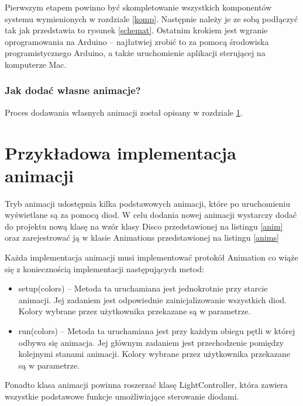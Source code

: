 \documentclass[12pt]{report}
\begin{document}
Pierwszym etapem powinno być skompletowanie wszystkich komponentów systemu wymienionych w rozdziale \ref{komp}. Następnie należy je ze sobą podłączyć tak jak przedstawia to rysunek \ref{schemat}. Ostatnim krokiem jest wgranie oprogramowania na Arduino -- najłatwiej zrobić to za pomocą środowiska programistycznego Arduino, a także uruchomienie aplikacji sterującej na komputerze Mac. 

\subsubsection{Jak dodać własne animacje?}

Proces dodawania własnych animacji został opisany w rozdziale  \ref{animacje}.

\section{Przykładowa implementacja animacji} \label{animacje}

Tryb animacji udostępnia kilka podstawowych animacji, które po uruchomieniu wyświetlane są za pomocą diod. W celu dodania nowej animacji wystarczy dodać do projektu nową klasę na wzór klasy Disco przedstawionej na listingu \ref{anim} oraz zarejestrować ją w klasie Animations przedstawionej na listingu \ref{anims}

 \label{anim}

Każda implementacja animacji musi implementować protokół Animation co wiąże się z koniecznością implementacji następujących metod:

\begin{itemize}
	\item setup(colors) -- Metoda ta uruchamiana jest jednokrotnie przy starcie animacji. Jej zadaniem jest odpowiednie zainicjalizowanie wszystkich diod. Kolory wybrane przez użytkownika przekazane są w parametrze.
	\item run(colors) -- Metoda ta uruchamiana jest przy każdym obiegu pętli w której odbywa się animacja. Jej głównym zadaniem jest przechodzenie pomiędzy kolejnymi stanami animacji. Kolory wybrane przez użytkownika przekazane są w parametrze.
\end{itemize}

Ponadto klasa animacji powinna roszerzać klasę LightController, która zawiera wszystkie podstawowe funkcje umożliwiające sterowanie diodami.
\end{document}
